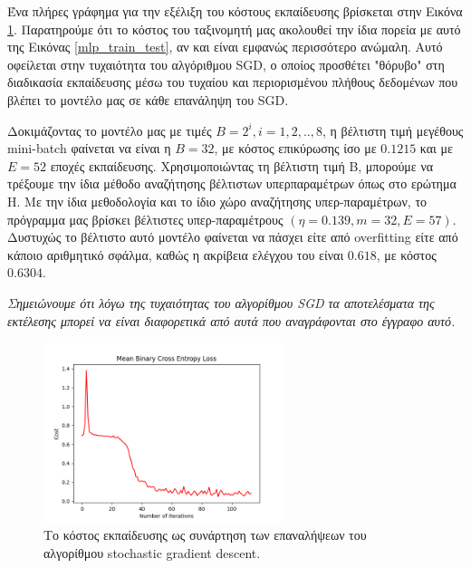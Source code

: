 \documentclass{article}
\begin{document}
 Ένα πλήρες γράφημα για την εξέλιξη του κόστους εκπαίδευσης βρίσκεται στην Εικόνα \ref{sgd_train_test}. Παρατηρούμε ότι το κόστος του ταξινομητή μας ακολουθεί την ίδια πορεία με αυτό της Εικόνας \ref{mlp_train_test}, αν και είναι εμφανώς περισσότερο ανώμαλη. Αυτό οφείλεται στην τυχαιότητα του αλγόριθμου SGD, ο οποίος προσθέτει "θόρυβο" στη διαδικασία εκπαίδευσης μέσω του τυχαίου και περιορισμένου πλήθους δεδομένων που βλέπει το μοντέλο μας σε κάθε επανάληψη του SGD.

Δοκιμάζοντας το μοντέλο μας με τιμές $Β=2^{i}, i=1,2,..,8$, η βέλτιστη τιμή μεγέθους mini-batch φαίνεται να είναι η $B=32$, με κόστος επικύρωσης ίσο με $0.1215$ και με $Ε=52$ εποχές εκπαίδευσης. Χρησιμοποιώντας τη βέλτιστη τιμή B, μπορούμε να τρέξουμε την ίδια μέθοδο αναζήτησης βέλτιστων υπερπαραμέτρων όπως στο ερώτημα Η. Με την ίδια μεθοδολογία και το ίδιο χώρο αναζήτησης υπερ-παραμέτρων, το πρόγραμμα μας βρίσκει βέλτιστες υπερ-παραμέτρους $(\eta=0.139, m=32, E=57)$. Δυστυχώς το βέλτιστο αυτό μοντέλο φαίνεται να πάσχει είτε από overfitting είτε από κάποιο αριθμητικό σφάλμα, καθώς η ακρίβεια ελέγχου του είναι $0.618$, με κόστος $0.6304$. 

\textit{Σημειώνουμε ότι λόγω της τυχαιότητας του αλγορίθμου SGD τα αποτελέσματα της εκτέλεσης μπορεί να είναι διαφορετικά από αυτά που αναγράφονται στο έγγραφο αυτό.}

\begin{figure}
	\includegraphics[width=7cm]{sgd_error.png}
	\centering
	\caption{Το κόστος εκπαίδευσης ως συνάρτηση των επαναλήψεων του αλγορίθμου stochastic gradient descent.}
	\label{sgd_train_test}
\end{figure}


\printbibliography
\end{document}
